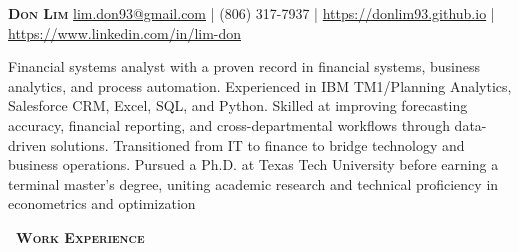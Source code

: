 \documentclass[a4paper,12pt]{article}
\newcommand{\header} [1] {
    \vspace{1mm}
    {\textsc{\textbf{\Large{\xrfill[0.5ex]{0.5pt}~#1~\xrfill[0.5ex]{0.5pt}}}}} %
    \vspace{1mm}
}
\begin{document}
\fontsize{11.0}{11.5}\selectfont

\begin{raggedright}
    {\Huge\textsc\textbf{{{Don Lim}}}} \hfill
    \href{mailto:lim.don93@gmail.com}{lim.don93@gmail.com} | (806) 317-7937 | \href{https://donlim93.github.io/}{https://donlim93.github.io} | \href{https://www.linkedin.com/in/lim-don/}{https://www.linkedin.com/in/lim-don} \\ \vspace{2mm}
\end{raggedright}

Financial systems analyst with a proven record in financial systems, business analytics, and process automation. Experienced in IBM TM1/Planning Analytics, Salesforce CRM, Excel, SQL, and Python. Skilled at improving forecasting accuracy, financial reporting, and cross-departmental workflows through data-driven solutions. Transitioned from IT to finance to bridge technology and business operations. Pursued a Ph.D. at Texas Tech University before earning a terminal master’s degree, uniting academic research and technical proficiency in econometrics and optimization 

\vspace{1mm}
\header{Work Experience} 
\end{document}
